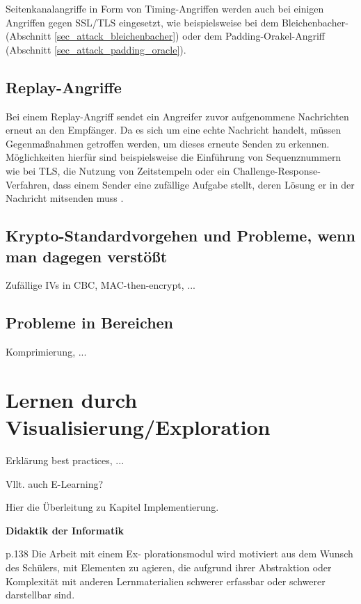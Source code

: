 Seitenkanalangriffe in Form von Timing-Angriffen werden auch bei einigen Angriffen gegen SSL/TLS eingesetzt, wie beispielsweise bei dem Bleichenbacher- (Abschnitt \ref{sec_attack_bleichenbacher}) oder dem Padding-Orakel-Angriff (Abschnitt \ref{sec_attack_padding_oracle}).

\subsection{Replay-Angriffe}

Bei einem Replay-Angriff sendet ein Angreifer zuvor aufgenommene Nachrichten erneut an den Empfänger. Da es sich um eine echte Nachricht handelt, müssen Gegenmaßnahmen getroffen werden, um dieses erneute Senden zu erkennen. Möglichkeiten hierfür sind beispielsweise die Einführung von Sequenznummern wie bei TLS, die Nutzung von Zeitstempeln oder ein Challenge-Response-Verfahren, dass einem Sender eine zufällige Aufgabe stellt, deren Lösung er in der Nachricht mitsenden muss \cite{ferguson10}.

\subsection{Krypto-Standardvorgehen und Probleme, wenn man dagegen verstößt}
Zufällige IVs in CBC, MAC-then-encrypt, ...

\subsection{Probleme in  Bereichen}
Komprimierung, ...

\section{Lernen durch Visualisierung/Exploration}

\begin{mdframed}
Erklärung best practices, ...

Vllt. auch E-Learning?

Hier die Überleitung zu Kapitel Implementierung. 
\end{mdframed}

\textbf{Didaktik der Informatik}

p.138
 Die Arbeit mit einem Ex-
plorationsmodul wird motiviert aus dem Wunsch des Schülers, mit Elementen 
zu  agieren,  die  aufgrund  ihrer  Abstraktion  oder  Komplexität  mit  anderen 
Lernmaterialien schwerer erfassbar oder schwerer darstellbar sind. 

